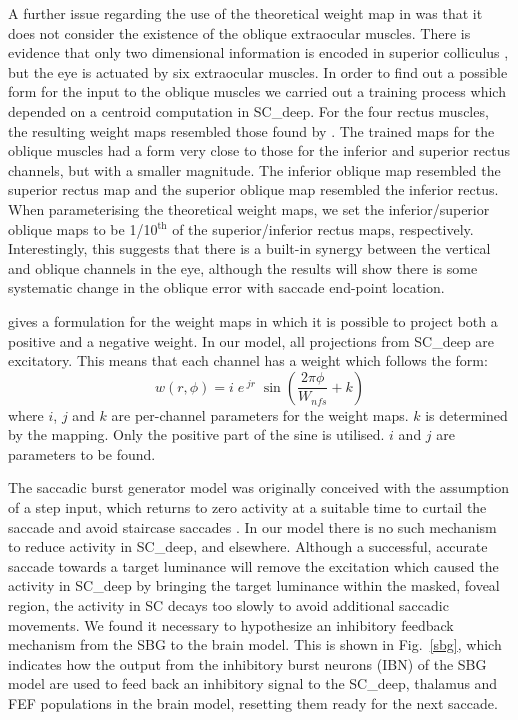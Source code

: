 \documentclass{frontiersSCNS}
\begin{document}
A further issue regarding the use of the theoretical weight map
in \cite{tabareau_geometry_2007} was that it does not consider the
existence of the oblique extraocular muscles. There is evidence that
only two dimensional information is encoded in superior
colliculus \citep{wurtz_activity_1972,hepp_monkey_1993,van_opstal_two-rather_1991}, but the
eye is actuated by six extraocular muscles. In order to find out a
possible form for the input to the oblique muscles we carried out a
training process
which depended on a
centroid computation in SC\_deep. For the four rectus muscles, the
resulting weight maps resembled those found by
\cite{arai_two-dimensional_1994}. The trained
maps for the oblique muscles had a form very close to those for the
inferior and superior rectus channels, but with a smaller magnitude.
The inferior oblique map resembled the superior rectus map and the
superior oblique map resembled the inferior rectus. When parameterising
the theoretical weight maps, we set the inferior/superior
oblique maps to be 1/10$^{\mathrm{th}}$ of the superior/inferior rectus
maps, respectively. Interestingly, this suggests that there is a built-in
synergy between the vertical and oblique channels in the eye, although
the results will show there is some systematic change in the oblique error
with saccade end-point location.

\cite{tabareau_geometry_2007} gives a formulation for the weight maps
in which it is possible to project both a positive and a negative
weight. In our model, all projections from SC\_deep are excitatory.
This means that each channel has a weight which follows the form:
\begin{equation} \label{eq:weightmaps}
w(r,\phi) = i\;e\,^{jr}\;\sin\left(\frac{2\pi\phi}{W_{nfs}} + k\right)
\end{equation}
where $i$, $j$ and $k$ are per-channel parameters for the weight
maps. $k$ is determined by the mapping. Only the positive part of the
sine is utilised. $i$ and $j$ are parameters to be found.

The saccadic burst generator model was originally conceived with the
assumption of a step input, which returns to zero activity at a suitable
time to curtail the saccade and avoid staircase
saccades \citep{gancarz_neural_1998}. In our model
there is no such mechanism to reduce activity in SC\_deep, and elsewhere.
Although a successful, accurate saccade towards a target luminance will
remove the excitation
which caused the activity in SC\_deep by bringing the target luminance
within the masked,
foveal region, the activity in SC decays too slowly to avoid
additional saccadic movements. We found it necessary to hypothesize
an inhibitory feedback mechanism from the SBG to the brain model.
This is shown in Fig.~\ref{sbg}, which indicates how the output from
the inhibitory burst neurons (IBN) of the SBG model are used to feed
back an inhibitory signal to the SC\_deep, thalamus and FEF populations
in the brain model, resetting them ready for the next saccade.
\end{document}
